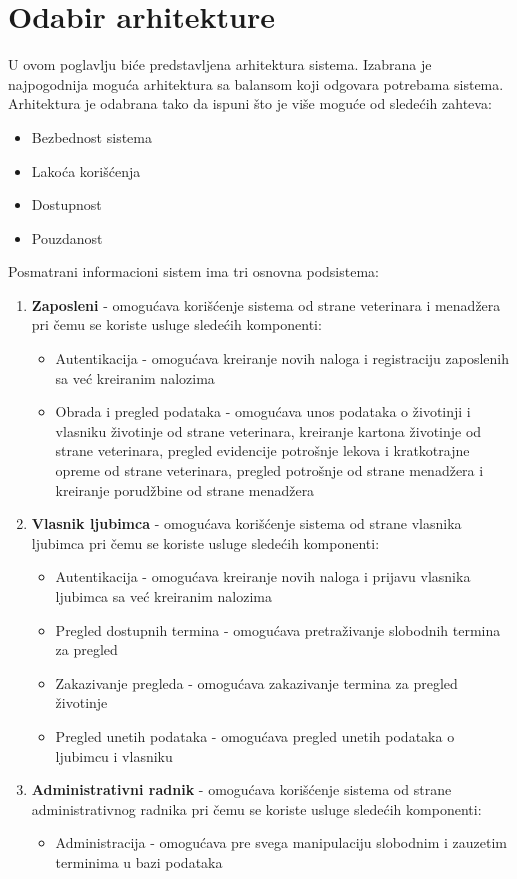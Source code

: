 \section{Odabir arhitekture}
U ovom poglavlju biće predstavljena arhitektura sistema. 
Izabrana je najpogodnija moguća arhitektura sa balansom koji odgovara potrebama sistema.
Arhitektura je odabrana tako da ispuni što je više moguće od sledećih zahteva:
\begin{itemize}
    \item Bezbednost sistema
    \item Lakoća korišćenja
    \item Dostupnost
    \item Pouzdanost
\end{itemize}

Posmatrani informacioni sistem ima tri osnovna podsistema:

\begin{enumerate}
    \item \textbf{Zaposleni} - omogućava korišćenje sistema od strane veterinara i menadžera pri čemu se koriste usluge sledećih komponenti:
        \begin{itemize}
            \item Autentikacija - omogućava kreiranje novih naloga i registraciju zaposlenih sa već kreiranim nalozima
            \item Obrada i pregled podataka - omogućava unos podataka o životinji i vlasniku životinje od strane veterinara, kreiranje kartona životinje od strane veterinara, pregled evidencije potrošnje lekova i kratkotrajne opreme od strane veterinara, pregled potrošnje od strane menadžera i kreiranje porudžbine od strane menadžera
        \end{itemize}
    \item \textbf{Vlasnik ljubimca} - omogućava korišćenje sistema od strane vlasnika ljubimca pri čemu se koriste usluge sledećih komponenti:
        \begin{itemize}
            \item Autentikacija - omogućava kreiranje novih naloga i prijavu vlasnika ljubimca sa već kreiranim nalozima
            \item Pregled dostupnih termina - omogućava pretraživanje slobodnih termina za pregled
            \item Zakazivanje pregleda - omogućava zakazivanje termina za pregled životinje
            \item Pregled unetih podataka - omogućava pregled unetih podataka o ljubimcu i vlasniku
        \end{itemize}
    \item \textbf{Administrativni radnik} - omogućava korišćenje sistema od strane administrativnog radnika pri čemu se koriste usluge sledećih komponenti:
        \begin{itemize}
            \item Administracija - omogućava pre svega manipulaciju slobodnim i zauzetim terminima u bazi podataka
        \end{itemize}
\end{enumerate}

